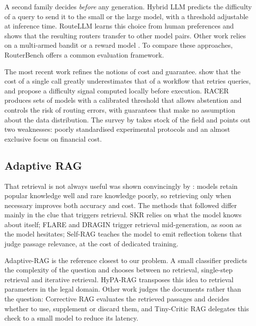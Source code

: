 \documentclass[11pt,a4paper]{article}
\begin{document}
A second family decides \emph{before} any generation. Hybrid LLM \citep{ding2024hybrid} predicts the
difficulty of a query to send it to the small or the large model, with a threshold adjustable at
inference time. RouteLLM \citep{ong2024routellm} learns this choice from human preferences and shows
that the resulting routers transfer to other model pairs. Other work relies on a multi-armed bandit
\citep{nguyen2024metallm} or a reward model \citep{lu2023zooter}. To compare these approaches,
RouterBench \citep{hu2024routerbench} offers a common evaluation framework.

The most recent work refines the notions of cost and guarantee. \citet{fu2026inflation} show that the
cost of a single call greatly underestimates that of a workflow that retries queries, and propose a
difficulty signal computed locally before execution. RACER \citep{hao2026racer} produces sets of models
with a calibrated threshold that allows abstention and controls the risk of routing errors, with
guarantees that make no assumption about the data distribution. The survey by \citet{varangot2025survey}
takes stock of the field and points out two weaknesses: poorly standardised experimental protocols and
an almost exclusive focus on financial cost.

\subsection{Adaptive RAG}

That retrieval is not always useful was shown convincingly by \citet{mallen2022trust}: models retain
popular knowledge well and rare knowledge poorly, so retrieving only when necessary improves both
accuracy and cost. The methods that followed differ mainly in the clue that triggers retrieval. SKR
\citep{wang2023skr} relies on what the model knows about itself; FLARE \citep{jiang2023flare} and DRAGIN
\citep{su2024dragin} trigger retrieval mid-generation, as soon as the model hesitates; Self-RAG
\citep{asai2023selfrag} teaches the model to emit reflection tokens that judge passage relevance, at the
cost of dedicated training.

Adaptive-RAG \citep{jeong2024adaptiverag} is the reference closest to our problem. A small classifier
predicts the complexity of the question and chooses between no retrieval, single-step retrieval and
iterative retrieval. HyPA-RAG \citep{kalra2024hyparag} transposes this idea to retrieval parameters in
the legal domain. Other work judges the documents rather than the question: Corrective RAG
\citep{yan2024crag} evaluates the retrieved passages and decides whether to use, supplement or discard
them, and Tiny-Critic RAG \citep{wu2026tinycritic} delegates this check to a small model to reduce its
latency.
\end{document}
